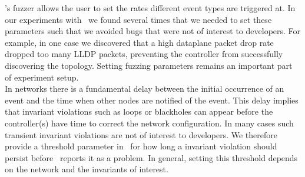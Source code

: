  \projectname's fuzzer allows the
user to set the rates different event types are triggered at. In our experiments with
\projectname~we found several times that we needed to set these parameters
such that we avoided bugs that were not of interest to developers.
For example, in one case we discovered that a high dataplane
packet drop rate dropped too many LLDP packets, preventing the controller from successfully discovering the topology.
Setting fuzzing parameters remains an important
part of experiment setup.\\[0.5ex]
%
 In
networks there is a fundamental delay between the initial occurrence of an
event and the time when other nodes are notified of the event. This delay implies
that invariant violations such as loops or blackholes can appear
before the controller(s) have time to correct the network configuration. In
many cases such transient invariant violations are not of interest to
developers. We therefore provide a threshold parameter in \projectname~for
how long a invariant violation should persist before
\projectname~reports it as a problem. In general, setting this
threshold depends on the network and the invariants of
interest.%



